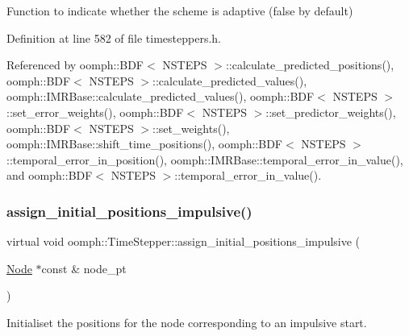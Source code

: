 Function to indicate whether the scheme is adaptive (false by default) 



Definition at line 582 of file timesteppers.\+h.



Referenced by oomph\+::\+B\+D\+F$<$ N\+S\+T\+E\+P\+S $>$\+::calculate\+\_\+predicted\+\_\+positions(), oomph\+::\+B\+D\+F$<$ N\+S\+T\+E\+P\+S $>$\+::calculate\+\_\+predicted\+\_\+values(), oomph\+::\+I\+M\+R\+Base\+::calculate\+\_\+predicted\+\_\+values(), oomph\+::\+B\+D\+F$<$ N\+S\+T\+E\+P\+S $>$\+::set\+\_\+error\+\_\+weights(), oomph\+::\+B\+D\+F$<$ N\+S\+T\+E\+P\+S $>$\+::set\+\_\+predictor\+\_\+weights(), oomph\+::\+B\+D\+F$<$ N\+S\+T\+E\+P\+S $>$\+::set\+\_\+weights(), oomph\+::\+I\+M\+R\+Base\+::shift\+\_\+time\+\_\+positions(), oomph\+::\+B\+D\+F$<$ N\+S\+T\+E\+P\+S $>$\+::temporal\+\_\+error\+\_\+in\+\_\+position(), oomph\+::\+I\+M\+R\+Base\+::temporal\+\_\+error\+\_\+in\+\_\+value(), and oomph\+::\+B\+D\+F$<$ N\+S\+T\+E\+P\+S $>$\+::temporal\+\_\+error\+\_\+in\+\_\+value().

\mbox{\label{classoomph_1_1TimeStepper_ab66972f0eaf3ba34645793e23e46afd5}} 
\subsubsection{\texorpdfstring{assign\+\_\+initial\+\_\+positions\+\_\+impulsive()}{assign\_initial\_positions\_impulsive()}}
{\footnotesize\ttfamily virtual void oomph\+::\+Time\+Stepper\+::assign\+\_\+initial\+\_\+positions\+\_\+impulsive (\begin{DoxyParamCaption}\item[{\hyperlink{classoomph_1_1Node}{Node} $\ast$const \&}]{node\+\_\+pt }\end{DoxyParamCaption})\hspace{0.3cm}{\ttfamily [pure virtual]}}



Initialiset the positions for the node corresponding to an impulsive start. 



